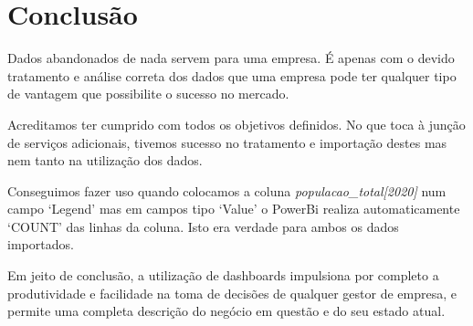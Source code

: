 \section*{Conclusão}
Dados abandonados de nada servem para uma empresa. É apenas com o devido tratamento e análise correta dos dados que uma empresa pode ter qualquer tipo de vantagem que possibilite o sucesso no mercado.

Acreditamos ter cumprido com todos os objetivos definidos.
No que toca à junção de serviços adicionais, tivemos sucesso no tratamento e importação destes mas nem tanto na utilização dos dados.

Conseguimos fazer uso quando colocamos a coluna \textit{populacao\_total[2020]} num campo `Legend' mas em campos tipo `Value' o PowerBi realiza automaticamente `COUNT' das linhas da coluna. Isto era verdade para ambos os dados importados.

Em jeito de conclusão, a utilização de dashboards impulsiona por completo a produtividade e facilidade na toma de decisões de qualquer gestor de empresa, e permite uma completa descrição do negócio em questão e do seu estado atual.